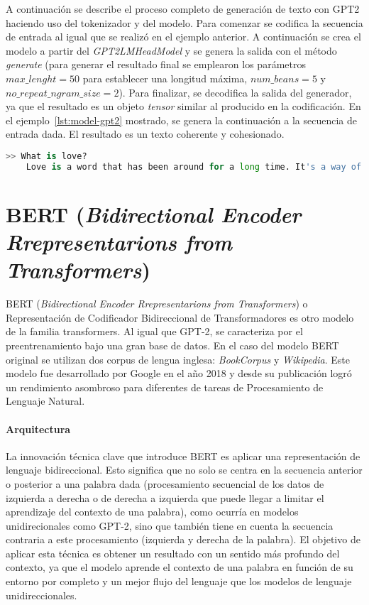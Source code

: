 A continuación se describe el proceso completo de generación de texto con GPT2 haciendo uso del tokenizador y del modelo. Para comenzar se codifica la secuencia de entrada al igual que se realizó en el ejemplo anterior. A continuación se crea el modelo a partir del \textit{GPT2LMHeadModel} y se genera la salida con el método \textit{generate} (para generar el resultado final se emplearon los parámetros $max\_lenght=50$ para establecer una longitud máxima, $num\_beans=5$ y $no\_repeat\_ngram\_size=2$). Para finalizar, se decodifica la salida del generador, ya que el resultado es un objeto \textit{tensor} similar al producido en la codificación. En el ejemplo~\ref{lst:model-gpt2} mostrado, se genera la continuación a la secuencia de entrada dada. El resultado es un texto coherente y cohesionado.

\begin{lstlisting}[language=Python, caption=Ejemplo de uso de \textit{GPT2LMHeadModel}, label={lst:model-gpt2}]
>> What is love?
	Love is a word that has been around for a long time. It's a way of saying "I love you, but I don't know what it means to love someone else."


\end{lstlisting} 



\section{BERT (\textit{Bidirectional Encoder Rrepresentarions from Transformers})}
BERT (\textit{Bidirectional Encoder Rrepresentarions from Transformers}) o Representación de Codificador Bidireccional de Transformadores \citep{Devlin2019BERTPO} es otro modelo de la familia transformers. Al igual que GPT-2, se caracteriza por el preentrenamiento bajo una gran base de datos. En el caso del modelo BERT original se utilizan dos corpus de lengua inglesa: \textit{BookCorpus} y \textit{Wikipedia}. Este modelo fue desarrollado por Google en el año 2018 y desde su publicación logró un rendimiento asombroso para diferentes de tareas de Procesamiento de Lenguaje Natural.

\paragraph{Arquitectura}\hfill

La innovación técnica clave que introduce BERT es aplicar una representación de lenguaje bidireccional. Esto significa que no solo se centra en la secuencia anterior o posterior a una palabra dada (procesamiento secuencial de los datos de izquierda a derecha o de derecha a izquierda que puede llegar a limitar el aprendizaje del contexto de una palabra), como ocurría en modelos unidirecionales como GPT-2, sino que también tiene en cuenta la secuencia contraria a este procesamiento (izquierda y derecha de la palabra). El objetivo de aplicar esta técnica es obtener un resultado con un sentido más profundo del contexto, ya que el modelo aprende el contexto de una palabra en función de su entorno por completo  y un mejor flujo del lenguaje que los modelos de lenguaje unidireccionales.

